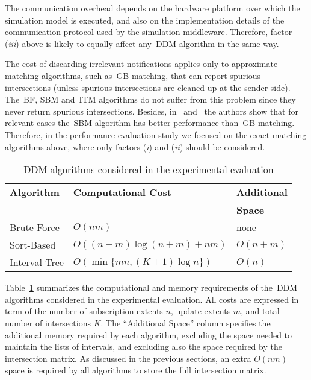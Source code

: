 \documentclass[10pt, conference, compsocconf]{IEEEtran}
\begin{document}
The communication overhead depends on the hardware platform over which
the simulation model is executed, and also on the implementation
details of the communication protocol used by the simulation
middleware. Therefore, factor (\emph{iii}) above is likely to equally
affect any~\ac{DDM} algorithm in the same way.

The cost of discarding irrelevant notifications applies only to
approximate matching algorithms, such as~\ac{GB} matching, that can
report spurious intersections (unless spurious intersections are
cleaned up at the sender side). The~\ac{BF}, \ac{SBM} and~\ac{ITM}
algorithms do not suffer from this problem since they never return
spurious intersections. Besides, in~\cite{Raczy2005}
and~\cite{6147978} the authors show that for relevant cases
the~\ac{SBM} algorithm has better performance than~\ac{GB} matching.
Therefore, in the performance evaluation study we focused on the exact
matching algorithms above, where only factors (\emph{i}) and
(\emph{ii}) should be considered.

\begin{table}[t]
\caption{\ac{DDM} algorithms considered in the experimental evaluation}\label{tab:alg-summary}
\centering\begin{tabular}{lll}
\toprule
\textbf{Algorithm} & \textbf{Computational Cost} & \textbf{Additional} \\
& & \textbf{Space} \\
\midrule
Brute Force & $O(nm)$ & none \\
Sort-Based & $O\left( (n+m) \log ( n+m ) + nm \right)$ & $O(n+m)$ \\
Interval Tree & $O\left( \min\{mn, (K+1) \log n\}\right)$ & $O(n)$ \\
\bottomrule
\end{tabular}
\end{table}

Table~\ref{tab:alg-summary} summarizes the computational and memory
requirements of the~\ac{DDM} algorithms considered in the experimental
evaluation. All costs are expressed in term of the number of
subscription extents $n$, update extents $m$, and total number of
intersections $K$. The ``Additional Space'' column specifies the
additional memory required by each algorithm, excluding the space
needed to maintain the lists of intervals, and excluding also the
space required by the intersection matrix. As discussed in the
previous sections, an extra $O(nm)$ space is required by all
algorithms to store the full intersection matrix.
\end{document}
